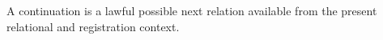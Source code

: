 \setcounter{theorem}{0}
\begin{definition}[Continuation]
A continuation is a lawful possible next relation available from the present relational and registration context.
\end{definition}

